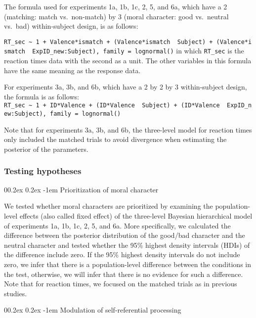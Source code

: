 \documentclass[
  man]{apa6}
\makeatletter
\let\oldparagraph\paragraph
\renewcommand{\paragraph}[1]{\oldparagraph{#1}\mbox{}}
\renewcommand{\paragraph}{\@startsection{paragraph}{4}{\parindent}%
  {0\baselineskip \@plus 0.2ex \@minus 0.2ex}%
  {-1em}%
  {\normalfont\normalsize\bfseries\itshape\typesectitle}}
\makeatother
\begin{document}
The formula used for experiments 1a, 1b, 1c, 2, 5, and 6a, which have a 2 (matching: match vs.~non-match) by 3 (moral character: good vs.~neutral vs.~bad) within-subject design, is as follows:

\texttt{RT\_sec\ \textasciitilde{}\ 1\ +\ Valence*ismatch\ +\ (Valence*ismatch\ \textbar{}\ Subject)\ +\ (Valence*ismatch\ \textbar{}\ ExpID\_new:Subject),\ family\ =\ lognormal()}
in which \texttt{RT\_sec} is the reaction times data with the second as a unit. The other variables in this formula have the same meaning as the response data.

For experiments 3a, 3b, and 6b, which have a 2 by 2 by 3 within-subject design, the formula is as follows:
\texttt{RT\_sec\ \textasciitilde{}\ 1\ +\ ID*Valence\ +\ (ID*Valence\ \textbar{}\ Subject)\ +\ (ID*Valence\ \textbar{}\ ExpID\_new:Subject),\ family\ =\ lognormal()}

Note that for experiments 3a, 3b, and 6b, the three-level model for reaction times only included the matched trials to avoid divergence when estimating the posterior of the parameters.

\hypertarget{testing-hypotheses}{%
\subsubsection{Testing hypotheses}\label{testing-hypotheses}}

\hypertarget{prioritization-of-moral-character}{%
\paragraph{Prioritization of moral character}\label{prioritization-of-moral-character}}

We tested whether moral characters are prioritized by examining the population-level effects (also called fixed effect) of the three-level Bayesian hierarchical model of experiments 1a, 1b, 1c, 2, 5, and 6a. More specifically, we calculated the difference between the posterior distribution of the good/bad character and the neutral character and tested whether the 95\% highest density intervals (HDIs) of the difference include zero. If the 95\% highest density intervals do not include zero, we infer that there is a population-level difference between the conditions in the test, otherwise, we will infer that there is no evidence for such a difference. Note that for reaction times, we focused on the matched trials as in previous studies.

\hypertarget{modulation-of-self-referential-processing}{%
\paragraph{Modulation of self-referential processing}\label{modulation-of-self-referential-processing}}
\end{document}
